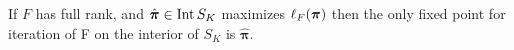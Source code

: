 

\begin{thm}\label{unique}
If $F$ has full rank, and \( \hat{\bm \pi} \in \operatorname{Int}S_K\) maximizes \( \ell_{F}({\bm\pi}) \) then the only fixed point for iteration of \Rpi F on the interior of \( S_K \) is \( \hat{\bm\pi} \).
\end{thm}

